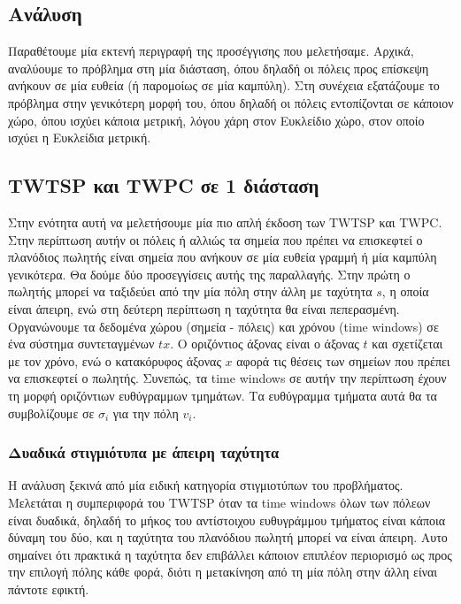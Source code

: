 \documentclass[oneside,12pt]{book}
\theoremstyle{definition}
\begin{document}
\subsection{Ανάλυση}

Παραθέτουμε μία εκτενή περιγραφή της προσέγγισης που μελετήσαμε. Αρχικά, αναλύουμε το πρόβλημα στη μία διάσταση, όπου δηλαδή οι πόλεις προς επίσκεψη ανήκουν σε μία ευθεία (ή παρομοίως σε μία καμπύλη). Στη συνέχεια εξατάζουμε το πρόβλημα στην γενικότερη μορφή του, όπου δηλαδή οι πόλεις εντοπίζονται σε κάποιον χώρο, όπου ισχύει κάποια μετρική, λόγου χάρη στον Ευκλείδιο χώρο, στον οποίο ισχύει η Ευκλείδια μετρική. \\

\subsection{TWTSP και TWPC σε 1 διάσταση}

Στην ενότητα αυτή να μελετήσουμε μία πιο απλή έκδοση των TWTSP και TWPC. Στην περίπτωση αυτήν οι πόλεις ή αλλιώς τα σημεία που πρέπει να επισκεφτεί ο πλανόδιος πωλητής είναι σημεία που ανήκουν σε μία ευθεία γραμμή ή μία καμπύλη γενικότερα. Θα δούμε δύο προσεγγίσεις αυτής της παραλλαγής. Στην πρώτη ο πωλητής μπορεί να ταξιδεύει από την μία πόλη στην άλλη με ταχύτητα \(s\), η οποία είναι άπειρη, ενώ στη δεύτερη περίπτωση η ταχύτητα θα είναι πεπερασμένη. \\

Οργανώνουμε τα δεδομένα χώρου (σημεία - πόλεις) και χρόνου (time windows) σε ένα σύστημα συντεταγμένων \(tx\). Ο οριζόντιος άξονας είναι ο άξονας \(t\) και σχετίζεται με τον χρόνο, ενώ ο κατακόρυφος άξονας \(x\) αφορά τις θέσεις των σημείων που πρέπει να επισκεφτεί ο πωλητής. Συνεπώς, τα time windows σε αυτήν την περίπτωση έχουν τη μορφή οριζόντιων ευθύγραμμων τμημάτων. Τα ευθύγραμμα τμήματα αυτά θα τα συμβολίζουμε σε \(σ_i\) για την πόλη \(v_i\). \\

\subsubsection{Δυαδικά στιγμιότυπα με άπειρη ταχύτητα}

Η ανάλυση ξεκινά από μία ειδική κατηγορία στιγμιοτύπων του προβλήματος. Μελετάται η συμπεριφορά του TWTSP όταν τα time windows όλων των πόλεων είναι δυαδικά, δηλαδή το μήκος του αντίστοιχου ευθυγράμμου τμήματος είναι κάποια δύναμη του δύο, και η ταχύτητα του πλανόδιου πωλητή μπορεί να είναι άπειρη. Αυτο σημαίνει ότι πρακτικά η ταχύτητα δεν επιβάλλει κάποιον επιπλέον περιορισμό ως προς την επιλογή πόλης κάθε φορά, διότι η μετακίνηση από τη μία πόλη στην άλλη είναι πάντοτε εφικτή. \\
\end{document}
